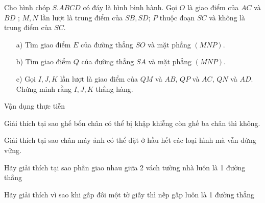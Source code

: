 \begin{vd}
	Cho hình chóp $S.ABCD$ có đáy là hình bình hành. Gọi $O$ là giao điểm của $AC$ và $BD$ ; $M, N$ lần lượt là trung điểm của $SB, SD$; $P$ thuộc đoạn $SC$ và không là trung điểm của $SC$.
	\begin{itemize}
		\item [a)] Tìm giao điểm $E$ của đường thẳng $SO$ và mặt phẳng $\left(MNP\right)$.
		\item [b)] Tìm giao điểm $Q$ của đường thẳng $SA$ và mặt phẳng $\left(MNP\right)$.
		\item [c)] Gọi $I, J, K$ lần lượt là giao điểm của $QM$ và $AB$, $QP$ và $AC$, $QN$ và $AD$. Chứng minh rằng $I, J, K$ thẳng hàng.
	\end{itemize}
\end{vd}

\begin{dang}{Vận dụng thực tiễn}
\end{dang}
\begin{vd}
	Giải thích tại sao ghế bốn chân có thể bị khập khiễng còn ghế ba chân thì không. 
\end{vd}
\begin{vd}
	Giải thích tại sao chân máy ảnh có thể đặt ở hầu hết các loại hình mà vẫn đứng vững.
\end{vd}
\begin{vd}
	Hãy giải thích tại sao phần giao nhau giữa 2 vách tường nhà luôn là 1 đường thẳng 
\end{vd}
\begin{vd}
	Hãy giải thích vì sao khi gấp đôi một tờ giấy thì nếp gấp luôn là 1 đường thẳng 
\end{vd}

